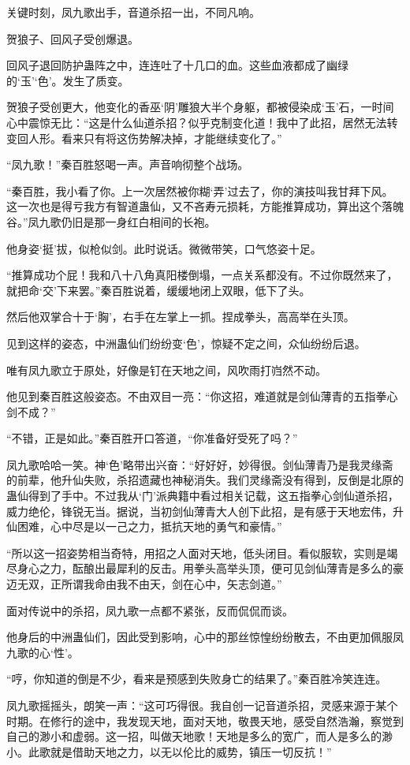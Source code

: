 \begin{this_body}
关键时刻，凤九歌出手，音道杀招一出，不同凡响。

贺狼子、回风子受创爆退。

回风子退回防护蛊阵之中，连连吐了十几口的血。这些血液都成了幽绿的‘玉’‘色’。发生了质变。

贺狼子受创更大，他变化的香巫‘阴’雕狼大半个身躯，都被侵染成‘玉’石，一时间心中震惊无比：“这是什么仙道杀招？似乎克制变化道！我中了此招，居然无法转变回人形。看来只有将这伤势解决掉，才能继续变化了。”

“凤九歌！”秦百胜怒喝一声。声音响彻整个战场。

“秦百胜，我小看了你。上一次居然被你糊‘弄’过去了，你的演技叫我甘拜下风。这一次也是得亏我方有智道蛊仙，又不吝寿元损耗，方能推算成功，算出这个落魄谷。”凤九歌仍旧是那一身红白相间的长袍。

他身姿‘挺’拔，似枪似剑。此时说话。微微带笑，口气悠姿十足。

“推算成功个屁！我和八十八角真阳楼倒塌，一点关系都没有。不过你既然来了，就把命‘交’下来罢。”秦百胜说着，缓缓地闭上双眼，低下了头。

然后他双掌合十于‘胸’，右手在左掌上一抓。捏成拳头，高高举在头顶。

见到这样的姿态，中洲蛊仙们纷纷变‘色’，惊疑不定之间，众仙纷纷后退。

唯有凤九歌立于原处，好像是钉在天地之间，风吹雨打岿然不动。

他见到秦百胜这般姿态。不由双目一亮：“你这招，难道就是剑仙薄青的五指拳心剑不成？”

“不错，正是如此。”秦百胜开口答道，“你准备好受死了吗？”

凤九歌哈哈一笑。神‘色’略带出兴奋：“好好好，妙得很。剑仙薄青乃是我灵缘斋的前辈，他升仙失败，杀招遗藏也神秘消失。我们灵缘斋没有得到，反倒是北原的蛊仙得到了手中。不过我从‘门’派典籍中看过相关记载，这五指拳心剑仙道杀招，威力绝伦，锋锐无当。据说，当初剑仙薄青大人创下此招，是有感于天地宏伟，升仙困难，心中尽是以一己之力，抵抗天地的勇气和豪情。”

“所以这一招姿势相当奇特，用招之人面对天地，低头闭目。看似服软，实则是竭尽身心之力，酝酿出最犀利的反击。用拳头高举头顶，便可见剑仙薄青是多么的豪迈无双，正所谓我命由我不由天，剑在心中，矢志剑道。”

面对传说中的杀招，凤九歌一点都不紧张，反而侃侃而谈。

他身后的中洲蛊仙们，因此受到影响，心中的那丝惊惶纷纷散去，不由更加佩服凤九歌的心‘性’。

“哼，你知道的倒是不少，看来是预感到失败身亡的结果了。”秦百胜冷笑连连。

凤九歌摇摇头，朗笑一声：“这可巧得很。我自创一记音道杀招，灵感来源于某个时期。在修行的途中，我发现天地，面对天地，敬畏天地，感受自然浩瀚，察觉到自己的渺小和虚弱。这一招，叫做天地歌！天地是多么的宽广，而人是多么的渺小。此歌就是借助天地之力，以无以伦比的威势，镇压一切反抗！”


\end{this_body}
